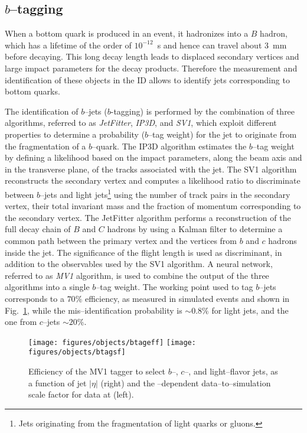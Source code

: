 \subsection{$b$--tagging}
\label{sec:btag}

When a bottom quark is produced in an event, it hadronizes into a $B$
hadron, which has a lifetime of the order of $10^{-12}$~s and hence
can travel about 3~mm before decaying.
This long decay length leads to displaced secondary vertices and large
impact parameters for the decay products. Therefore the measurement
and identification of these objects in the ID allows to identify jets
corresponding to bottom quarks.

The identification of $b$--jets ($b$-tagging) is performed by the
combination of three algorithms, referred to as {\it JetFitter}, {\it
  IP3D}, and {\it SV1}, which exploit different properties to
determine a probability ($b$--tag weight) for the jet to originate
from the fragmentation of a $b$--quark. 
The IP3D algorithm estimates the $b$--tag weight by defining a
likelihood based on the impact parameters, along the beam axis and in
the transverse plane, of the tracks associated with the jet.
The SV1 algorithm reconstructs the secondary vertex and computes a
likelihood ratio to discriminate between $b$--jets and light
jets\footnote{Jets originating from the fragmentation of light quarks
  or gluons.} using the number of track pairs in the secondary vertex,
their total invariant mass and the fraction of momentum corresponding
to the secondary vertex.
The JetFitter algorithm performs a reconstruction of the full decay
chain of $B$ and $C$ hadrons by using a Kalman filter to determine a
common path between the primary vertex and the vertices from $b$ and
$c$ hadrons inside the jet. The significance of the flight length is
used as discriminant, in addition to the observables used by the
SV1 algorithm.
A neural network, referred to as {\it MV1} algorithm, is used to combine the
output of the three algorithms into a single $b$--tag weight.
The working point used to tag $b$--jets corresponds to a $70\%$
efficiency, as measured in \ttbar{} simulated events and shown in
Fig.~\ref{fig:btag}, while the mis--identification probability is
$\sim0.8\%$ for light jets, and the one from $c$--jets $\sim20\%$. 

\begin{figure}[htb!]\centering
  \texttt{[image: figures/objects/btageff]}
  \texttt{[image: figures/objects/btagsf]}
  \caption{Efficiency of the MV1 tagger to select $b$--, $c$--, and
    light--flavor jets, as a function of jet $|\eta|$ (right) and the
    \pt{}--dependent data--to--simulation scale factor for data at
    \eighttev{} (left).}
  \label{fig:btag}
\end{figure}

